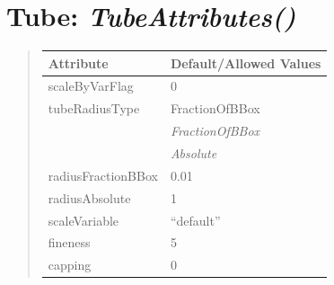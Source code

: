 \documentclass[letterpaper,10pt,english]{sphinxmanual}
\begin{document}
\section{\textbf{Tube}: \emph{TubeAttributes()}}
\label{attributes:tube-tubeattributes}
\begin{DUlineblock}{0em}
\item[] 
\end{DUlineblock}
\begin{quote}

\begin{tabulary}{\linewidth}{|L|L|}
\hline

\textbf{Attribute}
 & 
\textbf{Default/Allowed Values}
\\
\hline
scaleByVarFlag
 & 
0
\\
\hline
tubeRadiusType
 & 
FractionOfBBox
\\
\hline & 
\emph{FractionOfBBox}
\\
\hline & 
\emph{Absolute}
\\
\hline
radiusFractionBBox
 & 
0.01
\\
\hline
radiusAbsolute
 & 
1
\\
\hline
scaleVariable
 & 
``default''
\\
\hline
fineness
 & 
5
\\
\hline
capping
 & 
0
\\
\hline\end{tabulary}

\end{quote}

\begin{DUlineblock}{0em}
\item[] 
\end{DUlineblock}

\begin{DUlineblock}{0em}
\item[] 
\end{DUlineblock}
\end{document}
